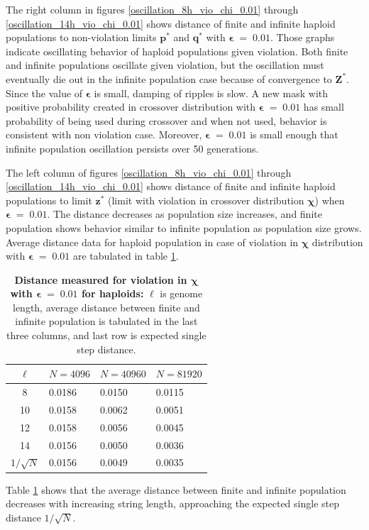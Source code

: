 \clearpage
The right column in figures \ref{oscillation_8h_vio_chi_0.01} through \ref{oscillation_14h_vio_chi_0.01} 
shows distance of finite and infinite haploid populations to non-violation limits $\bm{p^\ast}$ and $\bm{q^\ast}$ with $\bm{\epsilon} \;=\; 0.01$. 
Those graphs indicate oscillating behavior of haploid populations given violation. 
Both finite and infinite populations oscillate given violation, 
but the oscillation must eventually die out in the infinite population case because of convergence to $\bm{Z}^\ast$. 
Since the value of $\bm{\epsilon}$ is small, damping of ripples is slow. 
A new mask with positive probability created in crossover distribution with $\bm{\epsilon} \;=\; 0.01$ has small 
probability of being used during crossover and when not used, behavior is consistent with 
non violation case. Moreover, $\bm{\epsilon} \;=\; 0.01$ is small enough that 
infinite population oscillation persists over 50 generations. 

The left column of figures \ref{oscillation_8h_vio_chi_0.01} through \ref{oscillation_14h_vio_chi_0.01} 
shows distance of finite and infinite haploid populations to limit $\bm{z^\ast}$ 
(limit with violation in crossover distribution $\bm{\chi}$) when $\bm{\epsilon} \;=\; 0.01$. 
The distance decreases as population size increases, 
and finite population shows behavior similar to infinite population as population size grows. 
Average distance data for haploid population in case of violation in $\bm{\chi}$ distribution 
with $\bm{\epsilon} \;=\; 0.01$ are tabulated in table \ref{distanceChiHapEps0.01}.

\begin{table}[ht]
\caption[\textbf{Distance measured for violation in $\bm{\chi}$ with $\bm{\epsilon} \;=\; 0.01$  for haploids}]{\textbf{Distance measured for violation in $\bm{\chi}$ with $\bm{\epsilon} \;=\; 0.01$  for haploids:} $\ell$ is genome length, 
average distance between finite and infinite population is tabulated in the last three columns, and last row is expected single step distance.}
\centering
\begin{tabularx}{0.75\textwidth}{ c *{3}{X}}
\toprule
$\ell$ & $N = 4096$ & $N = 40960$ & $N = 81920$  \\
\midrule
8 & 0.0186	&  0.0150 	& 0.0115 \\
10 & 0.0158	&  0.0062 	& 0.0051 \\ 
12 & 0.0158	&  0.0056	& 0.0045 \\
14 & 0.0156	&  0.0050	& 0.0036 \\ 
\midrule
$1/\sqrt{N}$ & 0.0156 & 0.0049 & 0.0035 \\
\bottomrule
\end{tabularx}
\label{distanceChiHapEps0.01}
\end{table} 

Table \ref{distanceChiHapEps0.01} shows that the average distance 
between finite and infinite population decreases with increasing string length, approaching the expected single step distance 
$1/\sqrt{N}$. 